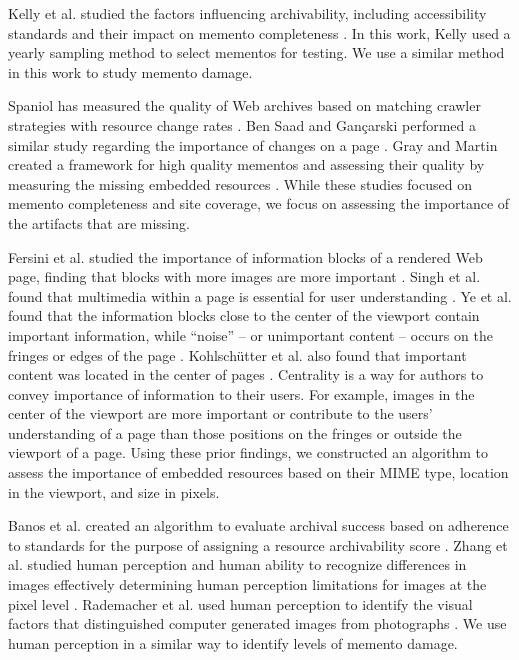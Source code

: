 Kelly et al. studied the factors influencing archivability, including accessibility standards and their impact on memento completeness \cite{kellyTPDL2013}. In this work, Kelly used a yearly sampling method to select mementos for testing. We use a similar method in this work to study memento damage.

Spaniol has measured the quality of Web archives based on matching crawler strategies with resource change rates \cite{spaniol9catch, spaniol2009data, Denev:2009:SFQ:1687627.1687694}. Ben Saad and Gan\c{c}arski performed a similar study regarding the importance of changes on a page \cite{saad2011}. Gray and Martin created a framework for high quality mementos and assessing their quality by measuring the missing embedded resources \cite{mementoQuality}. While these studies focused on memento completeness and site coverage, we focus on assessing the importance of the artifacts that are missing. 

Fersini et al. studied the importance of information blocks of a rendered Web page, finding that blocks with more images are more important \cite{Fersini20081431}. Singh et al. found that multimedia within a page is essential for user understanding \cite{Singh2009}. Ye et al. found that the information blocks close to the center of the viewport contain important information, while ``noise'' -- or unimportant content -- occurs on the fringes or edges of the page \cite{Yi2003}. Kohlsch\"{u}tter et al. also found that important content was located in the center of pages \cite{boilerPlate}. Centrality is a way for authors to convey importance of information to their users. For example, images in the center of the viewport are more important or contribute to the users' understanding of a page than those positions on the fringes or outside the viewport of a page. Using these prior findings, we constructed an algorithm to assess the importance of embedded resources based on their MIME type, location in the viewport, and size in pixels.

Banos et al. created an algorithm to evaluate archival success based on adherence to standards for the purpose of assigning a resource archivability score \cite{ipresArchivability}. Zhang et al. studied human perception and human ability to recognize differences in images effectively determining human perception limitations for images at the pixel level \cite{Zhang200830}. Rademacher et al. used human perception to identify the visual factors that distinguished computer generated images from photographs \cite{rademacher}. We use human perception in a similar way to identify levels of memento damage.

